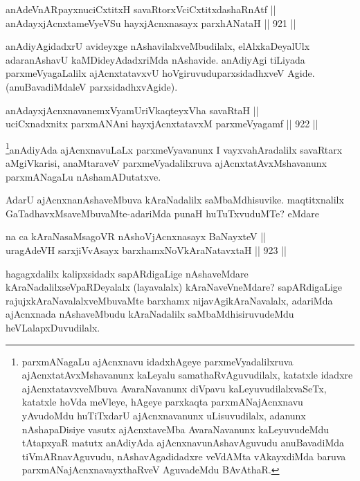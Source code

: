\begin{shl}
anAdeVnARpayxnuciCxtitxH savaRtorxVciCxtitxdashaRnAtf || \\
anAdayxjAcnxtameVyeVSu hayxjAcnxnasayx parxhANataH \hfill || 921 ||  
\end{shl}

\begin{artha}
anAdiyAgidadxrU avideyxge nAshavilalxveMbudilalx, elAlx\-\break kaDeyalUlx adaranAshavU kaMDideyAdadxriMda nAshavide. anAdiyAgi tiLiyada parxmeVyagaLalilx ajAcnxtatavxvU hoVgiruvudu\break parxsidadhxveV Agide.(anuBavadiMdaleV parxsidadhxvAgide).
\end{artha}


\begin{shl}
anAdayxjAcnxnavanemxVyamUriVkaqteyxVha savaRtaH || \\
uciCxnadxnitx parxmANAni hayxjAcnxtatavxM parxmeVyagamf \hfill || 922 ||  
\end{shl}

\begin{artha}
\footnote{parxmANagaLu ajAcnxnavu idadxhAgeye parxmeVyadalilxruva ajAcnxtatAvxMshavanunx kaLeyalu samathaRvAguvudilalx, katatxle idadxre ajAcnxtatavxveMbuva AvaraNavanunx diVpavu kaLeyuvudilalxvaSeTx, katatxle hoVda meVleye, hAgeye parxkaqta parxmANajAcnxnavu yAvudoMdu huTiTxdarU ajAcnxnavanunx uLisuvudilalx, adanunx nAshapaDisiye vasutx ajAcnxtaveMba AvaraNavanunx kaLeyuvudeMdu tAtapxyaR matutx anAdiyAda ajAcnxnavunAshavAguvudu anuBavadiMda tiVmARnavAguvudu, nAshavAgadidadxre veVdAMta vAkayxdiMda baruva parxmANajAcnxnavayxthaRveV AguvadeMdu BAvAthaR.}anAdiyAda ajAcnxnavuLaLx parxmeVyavanunx I vayxvahAradalilx savaRtarx aMgiVkarisi, anaMtaraveV parxmeVyadalilxruva ajAcnxtatAvxMshavanunx parxmANagaLu nAshamADutatxve.
\end{artha}

\begin{artha}
AdarU ajAcnxnanAshaveMbuva kAraNadalilx saMbaMdhisuvike. maqtitxnalilx GaTadhavxMsaveMbuvaMte-adariMda punaH huTuTxvuduMTe? eMdare\ndash 
\end{artha}

\begin{shl}
na ca kAraNasaMsagoVR nAshoV\s jAcnxnasayx BaNayxteV || \\
uragAdeVH sarxjiVvAsayx barxhamxNoV\s kAraNatavxtaH \hfill || 923 ||  
\end{shl}

\begin{artha}
hagagxdalilx kalipxsidadx sapARdigaLige nAshaveMdare kAraNadalilx\break seVpaRDeyalalx (layavalalx) kAraNaveVneMdare? sapARdigaLige rajujx\-kAraNavalalxveMbuvaMte barxhamx nijavAgikAraNavalalx, adariMda ajAcnxnada nAshaveMbudu kAraNadalilx saMbaMdhisiruvudeMdu heVLalapxDuvudilalx.
\end{artha}

